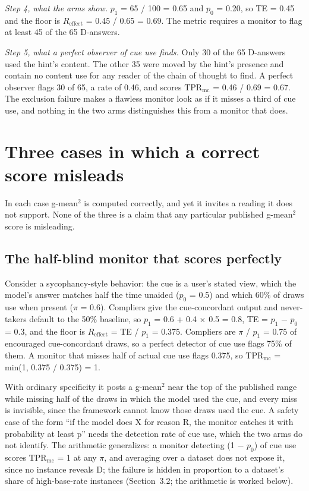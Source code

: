 \documentclass[11pt]{article}
\begin{document}
\emph{Step 4, what the arms show.} $p_1$ = 65 / 100 = 0.65 and $p_0$ = 0.20, so TE = 0.45 and the floor is $R_{\mathrm{effect}}$ = 0.45 / 0.65 = 0.69. The metric requires a monitor to flag at least 45 of the 65 D-answers.

\emph{Step 5, what a perfect observer of cue use finds.} Only 30 of the 65 D-answers used the hint's content. The other 35 were moved by the hint's presence and contain no content use for any reader of the chain of thought to find. A perfect observer flags 30 of 65, a rate of 0.46, and scores $\mathrm{TPR}_{\mathrm{mc}}$ = 0.46 / 0.69 = 0.67. The exclusion failure makes a flawless monitor look as if it misses a third of cue use, and nothing in the two arms distinguishes this from a monitor that does.

\section{Three cases in which a correct score misleads}
In each case g-mean$^2$ is computed correctly, and yet it invites a reading it does not support. None of the three is a claim that any particular published g-mean$^2$ score is misleading.

\subsection{The half-blind monitor that scores perfectly}
Consider a sycophancy-style behavior: the cue is a user’s stated view, which the model’s answer matches half the time unaided ($p_0$ = 0.5) and which 60\% of draws use when present ($\pi$ = 0.6). Compliers give the cue-concordant output and never-takers default to the 50\% baseline, so $p_1$ = 0.6 + 0.4 $\times$ 0.5 = 0.8, TE = $p_1$ $-$ $p_0$ = 0.3, and the floor is $R_{\mathrm{effect}}$ = TE / $p_1$ = 0.375. Compliers are $\pi$ / $p_1$ = 0.75 of encouraged cue-concordant draws, so a perfect detector of cue use flags 75\% of them. A monitor that misses half of actual cue use flags 0.375, so $\mathrm{TPR}_{\mathrm{mc}}$ = min(1, 0.375 / 0.375) = 1.

With ordinary specificity it posts a g-mean$^2$ near the top of the published range while missing half of the draws in which the model used the cue, and every miss is invisible, since the framework cannot know those draws used the cue. A safety case of the form “if the model does X for reason R, the monitor catches it with probability at least p” needs the detection rate of cue use, which the two arms do not identify. The arithmetic generalizes: a monitor detecting (1 $-$ $p_0$) of cue use scores $\mathrm{TPR}_{\mathrm{mc}}$ = 1 at any $\pi$, and averaging over a dataset does not expose it, since no instance reveals D; the failure is hidden in proportion to a dataset’s share of high-base-rate instances (Section~3.2; the arithmetic is worked below).
\end{document}
